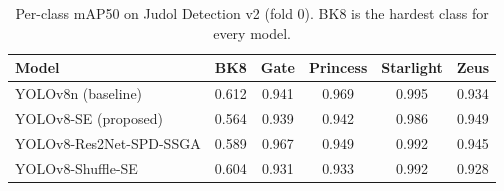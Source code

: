 \begin{table}[t]
\caption{Per-class mAP50 on Judol Detection v2 (fold 0). BK8 is the hardest class for every model.}
\label{tab:perclass}
\centering\footnotesize\renewcommand{\arraystretch}{1.2}
\begin{tabular}{@{}lccccc@{}}
\toprule
\textbf{Model} & \textbf{BK8} & \textbf{Gate} & \textbf{Princess} & \textbf{Starlight} & \textbf{Zeus} \\
\midrule
YOLOv8n (baseline) & 0.612 & 0.941 & 0.969 & 0.995 & 0.934 \\
YOLOv8-SE (proposed) & 0.564 & 0.939 & 0.942 & 0.986 & 0.949 \\
YOLOv8-Res2Net-SPD-SSGA & 0.589 & 0.967 & 0.949 & 0.992 & 0.945 \\
YOLOv8-Shuffle-SE & 0.604 & 0.931 & 0.933 & 0.992 & 0.928 \\
\bottomrule
\end{tabular}
\end{table}
